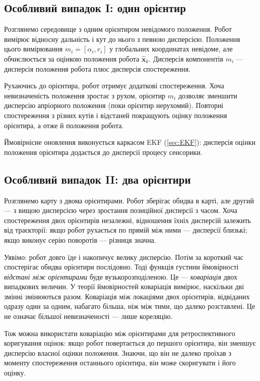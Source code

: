 \subsection{Особливий випадок I: один орієнтир}
Розглянемо середовище з одним орієнтиром невідомого положення. Робот вимірює відносну дальність і кут до нього з певною дисперсією. Положення цього вимірювання $m_i=[\alpha_i, r_i]$ у глобальних координатах невідоме, але обчислюється за оцінкою положення робота $\hat{\boldsymbol{x}}_k$. Дисперсія компонентів $m_i$ — дисперсія положення робота плюс дисперсія спостереження.

Рухаючись до орієнтира, робот отримує додаткові спостереження. Хоча невизначеність положення зростає з рухом, орієнтир $m_i$ дозволяє зменшити дисперсію апріорного положення (поки орієнтир нерухомий). Повторні спостереження з різних кутів і відстаней покращують оцінку положення орієнтира, а отже й положення робота.

Ймовірнісне оновлення виконується каркасом EKF (\cref{sec:EKF}): дисперсія оцінки положення орієнтира додається до дисперсії процесу сенсорики.

\subsection{Особливий випадок II: два орієнтири}
Розглянемо карту з двома орієнтирами. Робот зберігає обидва в карті, але другий — з вищою дисперсією через зростання позиційної дисперсії з часом. Хоча спостереження двох орієнтирів незалежні, відношення їхніх дисперсій залежить від траєкторії: якщо робот рухається по прямій між ними — дисперсії близькі; якщо виконує серію поворотів — різниця значна.

Уявімо: робот довго їде і накопичує велику дисперсію. Потім за короткий час спостерігає обидва орієнтири послідовно. Тоді функція густини ймовірності \emph{відстані між орієнтирами} буде вузькорозподіленою. Це — \emph{коваріація} двох випадкових величин. У теорії ймовірностей коваріація вимірює, наскільки дві змінні змінюються разом. Коваріація між локаціями двох орієнтирів, відвіданих одразу один за одним, набагато більша, ніж між тими, що далеко розставлені. Це не означає більшої невизначеності — лише кореляцію.

Тож можна використати коваріацію між орієнтирами для ретроспективного коригування оцінок: якщо робот повертається до першого орієнтира, він зменшує дисперсію власної оцінки положення. Знаючи, що він не далеко проїхав з моменту спостереження останнього орієнтира, він може скоригувати і його оцінку.

